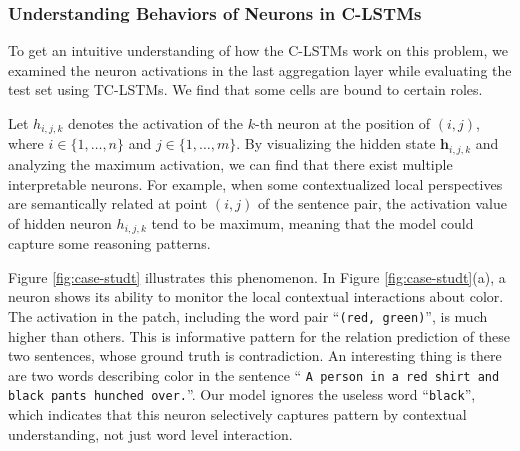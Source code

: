 \documentclass{article}
\def\h{\mathbf{h}}
\begin{document}
\subsubsection{Understanding Behaviors of Neurons in C-LSTMs}

To get an intuitive understanding of how the C-LSTMs work on this problem, we examined the neuron activations in the last aggregation layer while evaluating the test set using TC-LSTMs. We find that some cells are bound to certain roles.






Let $h_{i,j,k}$ denotes the activation of the $k$-th neuron at the position of $(i,j)$, where $i \in \{1,\ldots,n\}$ and $j \in \{1,\ldots,m\}$. By visualizing the hidden state $\h_{i,j,k}$ and analyzing the maximum activation, we can find that there exist multiple interpretable neurons.
For example, when some contextualized local perspectives are semantically related at point $({i},{j})$ of the sentence pair, the activation value of hidden neuron $h_{{i},{j},k}$ tend to be maximum, meaning that the model could capture some reasoning patterns.

Figure \ref{fig:case-studt} illustrates this phenomenon. In Figure \ref{fig:case-studt}(a), a neuron shows its ability to monitor the local contextual interactions about color.
The activation in the patch, including the word pair  ``\texttt{(red, green)}'', is much higher than others. This is informative pattern for the relation prediction of these two sentences, whose ground truth is contradiction. An interesting thing is there are two words describing color in the sentence `` \texttt{A person in a red shirt and black pants hunched over.}''. Our model ignores the useless word ``\texttt{black}'', which indicates that this neuron selectively captures pattern by contextual understanding, not just word level interaction.
\end{document}
